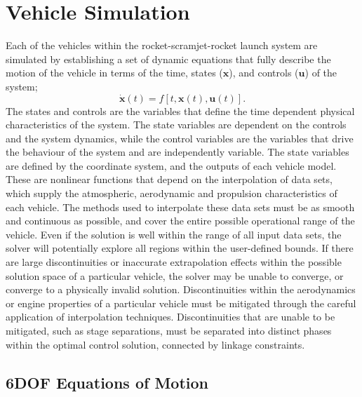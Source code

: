 \section{Vehicle Simulation}


Each of the vehicles within the rocket-scramjet-rocket launch system are simulated by establishing a set of dynamic equations that fully describe the motion of the vehicle in terms of the time, states ($\mathbf{x}$), and controls ($\mathbf{u}$) of the system;
\begin{equation}
\dot{\textbf{x}}(t) = f[t,\textbf{x}(t),\textbf{u}(t)].
\end{equation}
 The states and controls are the variables that define the time dependent physical characteristics of the system. The state variables are dependent on the controls and the system dynamics, while the control variables are the variables that drive the behaviour of the system and are independently variable.  
The state variables are defined by the coordinate system, and the outputs of each vehicle model. These are nonlinear functions that depend on the interpolation of data sets, which supply the atmospheric, aerodynamic and propulsion characteristics of each vehicle. 
The methods used to interpolate these data sets must be as smooth and continuous as possible, and cover the entire possible operational range of the vehicle. 
Even if the solution is well within the range of all input data sets, the solver will potentially explore all regions within the user-defined bounds. 
If there are large discontinuities or inaccurate extrapolation effects within the possible solution space of a particular vehicle, the solver may be unable to converge, or converge to a physically invalid solution. 
Discontinuities within the aerodynamics or engine properties of a particular vehicle must be mitigated through the careful application of interpolation techniques. Discontinuities that are unable to be mitigated, such as stage separations, must be separated into distinct phases within the optimal control solution, connected by linkage constraints. 

\subsection{6DOF Equations of Motion}


